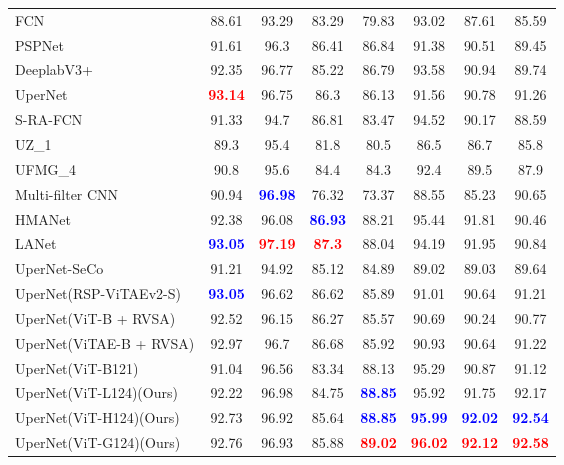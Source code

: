 \begin{table*}[t]{\textwidth=0mm}
{\begin{tabular}{l|c c c c c | c | c}
        FCN \cite{long2015fully} & 88.61 & 93.29 & 83.29 & 79.83 & 93.02 & 87.61 & 85.59 \\
        PSPNet \cite{zhao2017pyramid} & 91.61 & 96.3 & 86.41 & 86.84 & 91.38 & 90.51 & 89.45 \\
        DeeplabV3+ \cite{chen2018encoder} & 92.35 & 96.77 & 85.22 & 86.79 & 93.58 & 90.94 & 89.74 \\
        UperNet \cite{xiao2018unified} & \textbf{\textcolor{red}{93.14}} & 96.75 & 86.3 & 86.13 & 91.56 & 90.78 & 91.26 \\
        S-RA-FCN \cite{mou2020relation} & 91.33 & 94.7 & 86.81 & 83.47 & 94.52 & 90.17 & 88.59 \\ 
        UZ\_1 \cite{volpi2016dense}& 89.3 & 95.4 & 81.8 & 80.5 & 86.5 & 86.7 & 85.8 \\
        UFMG\_4 \cite{nogueira2019dynamic}& 90.8 & 95.6 & 84.4 & 84.3 & 92.4 & 89.5 & 87.9 \\
        Multi-filter CNN \cite{sun2018developing} & 90.94 & \textbf{\textcolor{blue}{96.98}} & 76.32 & 73.37 & 88.55 & 85.23 & 90.65 \\
        HMANet \cite{niu2021hybrid}& 92.38 & 96.08 & \textbf{\textcolor{blue}{86.93}} & 88.21 & 95.44 & 91.81 & 90.46 \\
        LANet \cite{ding2020lanet} & \textbf{\textcolor{blue}{93.05}} & \textbf{\textcolor{red}{97.19}} & \textbf{\textcolor{red}{87.3}} & 88.04 & 94.19 & 91.95 & 90.84 \\
        UperNet-SeCo \cite{manas2021seasonal} & 91.21 & 94.92 & 85.12 & 84.89 & 89.02 & 89.03 & 89.64 \\
        UperNet(RSP-ViTAEv2-S) \cite{wang2022empirical} & \textbf{\textcolor{blue}{93.05}} & 96.62 & 86.62 & 85.89 & 91.01 & 90.64 & 91.21 \\
        UperNet(ViT-B + RVSA) \cite{wang2022advancing} & 92.52 & 96.15 & 86.27 & 85.57 & 90.69 & 90.24 & 90.77 \\
        UperNet(ViTAE-B + RVSA) \cite{wang2022advancing} & 92.97 & 96.7 & 86.68 & 85.92 & 90.93 & 90.64 & 91.22 \\ \hline
        UperNet(ViT-B121)\cite{wang2022advancing} & 91.04 & 96.56 & 83.34 & 88.13 & 95.29 & 90.87 & 91.12 \\
        UperNet(ViT-L124)(Ours) & 92.22 & 96.98 & 84.75 & \textbf{\textcolor{blue}{88.85}} & 95.92 & 91.75 & 92.17 \\
        UperNet(ViT-H124)(Ours) & 92.73 & 96.92 & 85.64 & \textbf{\textcolor{blue}{88.85}} & \textbf{\textcolor{blue}{95.99}} & \textbf{\textcolor{blue}{92.02}} & \textbf{\textcolor{blue}{92.54}} \\
        UperNet(ViT-G124)(Ours) & 92.76 & 96.93 & 85.88 & \textbf{\textcolor{red}{89.02}} & \textbf{\textcolor{red}{96.02}} & \textbf{\textcolor{red}{92.12}} & \textbf{\textcolor{red}{92.58}} \\ \hline
       


\end{tabular}}
\end{table*}
